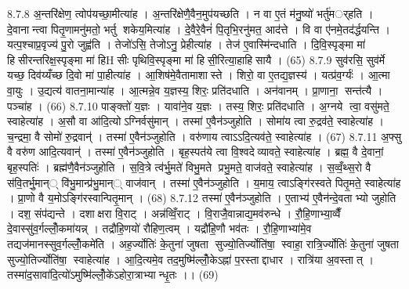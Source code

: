 8.7.8
अ॒न्तरि॑क्षेण॒ त्वोप॑यच्छा॒मीत्या॑ह । अ॒न्तरि॑क्षेणै॒वैन॒मुप॑यच्छति । न वा ए॒तं म॑नु॒ष्यो॑ भर्तु॑मर््हति । दे॒वानान्त्वा पितृ॒णामनु॑मतो॒ भर्तु शकेय॒मित्या॑ह । दे॒वैरे॒वैनं॑ पि॒तृभि॒रनु॑मत॒ आद॑त्ते । वि वा ए॑नमे॒तद॑र्द्धयन्ति । यत्प॒श्चाप्र॒वृज्य॑ पु॒रो जुह्व॑ति । तेजो॑ऽसि॒ तेजोऽनु॒ प्रेहीत्या॑ह । तेज॑ ए॒वास्मि॑न्दधाति । दि॒वि॒स्पृङ्मा मा॑ हिसीरन्तरिक्ष॒स्पृङ्मा मा॑ हिHसीः पृथिवि॒स्पृङ्मा मा॑ हिसी॒रित्या॒हाहिसायै । (65)
8.7.9
सुव॑रसि॒ सुव॑र्मे यच्छ॒ दिव॑य्यँच्छ दि॒वो मा॑ पा॒हीत्या॑ह । आ॒शिष॑मे॒वैतामाशास्ते । शिरो॒ वा ए॒तद्य॒ज्ञस्य॑ । यत्प्र॑व॒र्ग्यः॑ । आ॒त्मा वा॒युः । उ॒द्यत्य॑ वातना॒मान्या॑ह । आ॒त्मन्ने॒व य॒ज्ञस्य॒ शिरः॒ प्रति॑दधाति । अन॑वानम् । प्रा॒णाना॒ सन्त॑त्यै । पञ्चा॑ह । (66)
8.7.10
पाङ्क्तो॑ य॒ज्ञः । यावा॑ने॒व य॒ज्ञः । तस्य॒ शिरः॒ प्रति॑दधाति । अ॒ग्नये त्वा॒ वसु॑मते॒ स्वाहेत्या॑ह । अ॒सौ वा आ॑दि॒त्योऽग्निर्वसु॑मान् । तस्मा॑ ए॒वैन॑ञ्जुहोति । सोमा॑य त्वा रु॒द्रव॑ते॒ स्वाहेत्या॑ह । च॒न्द्रमा॒ वै सोमो॑ रु॒द्रवान्॑ । तस्मा॑ ए॒वैन॑ञ्जुहोति । वरु॑णाय त्वाऽऽदि॒त्यव॑ते॒ स्वाहेत्या॑ह । (67)
8.7.11
अ॒फ्सु वै वरु॑ण आदि॒त्यवान्॑ । तस्मा॑ ए॒वैन॑ञ्जुहोति । बृह॒स्पत॑ये त्वा वि॒श्वदेव्यावते॒ स्वाहेत्या॑ह । ब्रह्म॒ वै दे॒वानां॒ बृह॒स्पतिः॑ । ब्रह्म॑णै॒वैन॑ञ्जुहोति । स॒वि॒त्रे त्व॑र्भु॒मते॑ विभु॒मते प्रभु॒मते॒ वाज॑वते॒ स्वाहेत्या॑ह । स॒व्वँ॒थ्स॒रो वै स॑वि॒तर्भु॒मान्् वि॑भु॒मान्प्र॑भु॒मान्् वाज॑वान् । तस्मा॑ ए॒वैन॑ञ्जुहोति । य॒माय॒ त्वाऽङ्गि॑रस्वते पितृ॒मते॒ स्वाहेत्या॑ह । प्रा॒णो वै य॒मोऽङ्गि॑रस्वान्पितृ॒मान् । (68)
8.7.12
तस्मा॑ ए॒वैन॑ञ्जुहोति । ए॒ताभ्य॑ ए॒वैन॑न्दे॒वताभ्यो जुहोति । दश॒ संप॑द्यन्ते । दशाक्षरा वि॒राट् । अन्न॑व्विँ॒राट् । वि॒राजै॒वान्नाद्य॒मव॑रुन्धे । रौ॒हि॒णाभ्या॒व्वैँ दे॒वास्सु॑व॒र्गल्लोँ॒कमा॑यन्न् । तद्रौ॑हि॒णयो॑ रौहिण॒त्वम् । यद्रौ॑हि॒णौ भव॑तः । रौ॒हि॒णाभ्या॑मे॒व तद्यज॑मानस्सुव॒र्गल्लोँ॒कमे॑ति । अह॒र्ज्योतिः॑ के॒तुना॑ जुषता सुज्यो॒तिर्ज्योति॑षा॒ स्वाहा॒ रात्रि॒र्ज्योतिः॑ के॒तुना॑ जुषता सुज्यो॒तिर्ज्योति॑षा॒ स्वाहेत्या॑ह । आ॒दि॒त्यमे॒व तद॒मुष्मि॑ल्लोँ॒केऽह्ना॑ प॒रस्ताद्दाधार । रात्रि॑या अ॒वस्तात् । तस्मा॑द॒सावा॑दि॒त्यो॑ऽमुष्मि॑ल्लोँ॒के॑ऽहोरा॒त्राभ्यान्धृ॒तः ।। (69)
\anuvakamend

